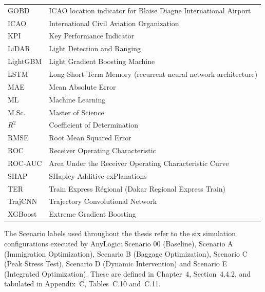 \begin{longtable}{@{}p{}p{}@{}}
GOBD &
ICAO location indicator for Blaise Diagne International Airport \\

ICAO &
International Civil Aviation Organization \\

KPI &
Key Performance Indicator \\

LiDAR &
Light Detection and Ranging \\

LightGBM &
Light Gradient Boosting Machine \\

LSTM &
Long Short-Term Memory (recurrent neural network architecture) \\

MAE &
Mean Absolute Error \\

ML &
Machine Learning \\

M.Sc. &
Master of Science \\

$R^2$ &
Coefficient of Determination \\

RMSE &
Root Mean Squared Error \\

ROC &
Receiver Operating Characteristic \\

ROC-AUC &
Area Under the Receiver Operating Characteristic Curve \\

SHAP &
SHapley Additive exPlanations \\

TER &
Train Express Régional (Dakar Regional Express Train) \\

TrajCNN &
Trajectory Convolutional Network \\

XGBoost &
Extreme Gradient Boosting \\

\bottomrule

\end{longtable}

\vspace{0.5cm}

\noindent
The Scenario labels used throughout the thesis refer to the six 
simulation configurations executed by AnyLogic: Scenario 00 (Baseline),
Scenario A (Immigration Optimization),
Scenario B (Baggage Optimization),
Scenario C (Peak Stress Test),
Scenario D (Dynamic Intervention) and
Scenario E (Integrated Optimization).
These are defined in Chapter~4, Section~4.4.2, and tabulated in
Appendix~C, Tables~C.10 and~C.11.